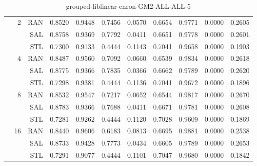 \begin{center}
\begin{table}[htbp]
\begin{tabular}{ | r | r | r | r | r | r | r | r | r | r | r |}
 & \multirow{3}{*}{2} & RAN & 0.8520 & 0.9448 & 0.7456 & 0.0570 & 0.6654 & 0.9771 & 0.0000 & 0.2605\\ \cline{3-11}
 &   & SAL & 0.8758 & 0.9369 & 0.7792 & 0.0411 & 0.6651 & 0.9778 & 0.0000 & 0.2601\\ \cline{3-11}
 &   & STL & 0.7300 & 0.9133 & 0.4444 & 0.1143 & 0.7041 & 0.9658 & 0.0000 & 0.1903\\ \cline{2-11}
 & \multirow{3}{*}{4} & RAN & 0.8487 & 0.9560 & 0.7092 & 0.0660 & 0.6539 & 0.9834 & 0.0000 & 0.2618\\ \cline{3-11}
 &   & SAL & 0.8775 & 0.9366 & 0.7835 & 0.0366 & 0.6662 & 0.9789 & 0.0000 & 0.2620\\ \cline{3-11}
 &   & STL & 0.7298 & 0.9381 & 0.4444 & 0.1136 & 0.7041 & 0.9672 & 0.0000 & 0.1896\\ \cline{2-11}
 & \multirow{3}{*}{8} & RAN & 0.8532 & 0.9547 & 0.7217 & 0.0652 & 0.6544 & 0.9817 & 0.0000 & 0.2670\\ \cline{3-11}
 &   & SAL & 0.8783 & 0.9366 & 0.7688 & 0.0411 & 0.6671 & 0.9781 & 0.0000 & 0.2608\\ \cline{3-11}
 &   & STL & 0.7281 & 0.9262 & 0.4444 & 0.1120 & 0.7028 & 0.9609 & 0.0000 & 0.1869\\ \cline{2-11}
 & \multirow{3}{*}{16} & RAN & 0.8440 & 0.9606 & 0.6183 & 0.0813 & 0.6695 & 0.9881 & 0.0000 & 0.2538\\ \cline{3-11}
 &   & SAL & 0.8733 & 0.9428 & 0.7773 & 0.0434 & 0.6605 & 0.9789 & 0.0000 & 0.2653\\ \cline{3-11}
 &   & STL & 0.7291 & 0.9077 & 0.4444 & 0.1101 & 0.7047 & 0.9680 & 0.0000 & 0.1842\\ \cline{2-11}
\hline
\end{tabular}
\caption{grouped-liblinear-enron-GM2-ALL-ALL-5}
\end{table}
\end{center}

